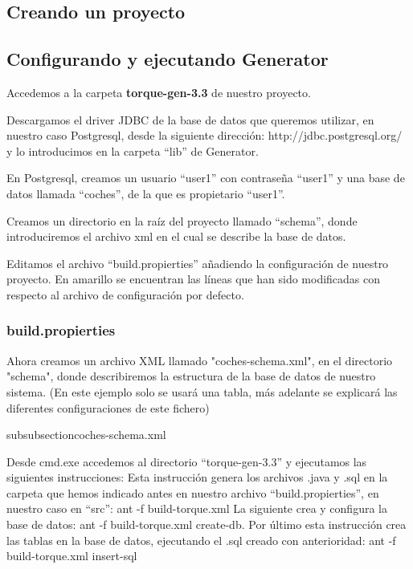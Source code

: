 \documentclass[12pt, oneside]{article}
\begin{document}
	\subsection{Creando un proyecto}
		

	\subsection{Configurando y ejecutando Generator}
		
Accedemos a la carpeta {\bf torque-gen-3.3} de nuestro proyecto.

Descargamos el driver JDBC de la base de datos que queremos utilizar, en nuestro caso Postgresql, desde la siguiente dirección: http://jdbc.postgresql.org/ y lo introducimos en la carpeta “lib” de Generator.

En Postgresql, creamos un usuario “user1” con contraseña “user1” y una base de datos llamada “coches”, de la que es propietario “user1”.

Creamos un directorio en la raíz del proyecto llamado “schema”, donde introduciremos el archivo xml en el cual se describe la base de datos.

Editamos el archivo “build.propierties” añadiendo la configuración de nuestro proyecto. En amarillo se encuentran las líneas que han sido modificadas con respecto al archivo de configuración por defecto.

\subsubsection{build.propierties}


Ahora creamos un archivo XML llamado "coches-schema.xml", en el directorio "schema", donde describiremos la estructura de la base de datos de nuestro sistema. (En este ejemplo solo se usará una tabla, más adelante se explicará las diferentes configuraciones de este fichero)

subsubsection{coches-schema.xml}


Desde cmd.exe accedemos al directorio “torque-gen-3.3” y ejecutamos las siguientes instrucciones: 
Esta instrucción genera los archivos .java y .sql en la carpeta que hemos indicado antes en nuestro archivo “build.propierties”, en nuestro caso en “src”: ant -f build-torque.xml 
La siguiente crea y configura la base de datos:  ant -f build-torque.xml create-db.
Por último esta instrucción crea las tablas en la base de datos, ejecutando el .sql creado con anterioridad: ant -f build-torque.xml insert-sql
\end{document}
